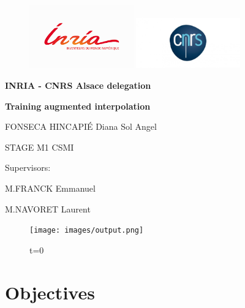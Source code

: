 \documentclass{article}
\begin{document}
\begin{titlepage}
\begin{figure} 
\includegraphics[width=0.4\textwidth]{images/inria.png}
\includegraphics[width=0.4\textwidth]{images/cnrslogo.jpeg}
    \centering
\end{figure}

\centering
\title{}\author{}\date{}
\centering
\vspace{3cm}
{\bfseries\LARGE INRIA - CNRS Alsace delegation\par}
\vspace{4cm}
{\bfseries\LARGE Training augmented interpolation \par}
\vspace{1cm}
{\Large FONSECA HINCAPIÉ Diana Sol Angel\par}
\vspace{1cm}
{\Large STAGE M1 CSMI \par}
\vspace{3cm}
{\Large Supervisors: \par}
\vspace{0.5cm}
{\Large M.FRANCK Emmanuel\par}
\vspace{0.5cm}
{\Large M.NAVORET Laurent\par}
\end{titlepage}

\begin{figure}[!h]
    \centering
    \texttt{[image: images/output.png]}
    \caption{t=0}
\end{figure}
\maketitle
\tableofcontents 
\newpage


\section{Objectives}
\end{document}

